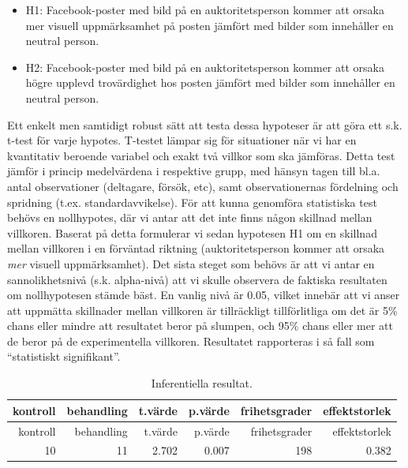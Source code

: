\documentclass[
]{book}
\begin{document}
\begin{itemize}
\item
  H1: Facebook-poster med bild på en auktoritetsperson kommer att orsaka mer visuell uppmärksamhet på posten jämfört med bilder som innehåller en neutral person.
\item
  H2: Facebook-poster med bild på en auktoritetsperson kommer att orsaka högre upplevd trovärdighet hos posten jämfört med bilder som innehåller en neutral person.
\end{itemize}

Ett enkelt men samtidigt robust sätt att testa dessa hypoteser är att göra ett s.k. t-test för varje hypotes. T-testet lämpar sig för situationer när vi har en kvantitativ beroende variabel och exakt två villkor som ska jämföras. Detta test jämför i princip medelvärdena i respektive grupp, med hänsyn tagen till bl.a. antal observationer (deltagare, försök, etc), samt observationernas fördelning och spridning (t.ex. standardavvikelse). För att kunna genomföra statistiska test behövs en nollhypotes, där vi antar att det inte finns någon skillnad mellan villkoren. Baserat på detta formulerar vi sedan hypotesen H1 om en skillnad mellan villkoren i en förväntad riktning (auktoritetsperson kommer att orsaka \emph{mer} visuell uppmärksamhet). Det sista steget som behövs är att vi antar en sannolikhetsnivå (s.k. alpha-nivå) att vi skulle observera de faktiska resultaten om nollhypotesen stämde bäst. En vanlig nivå är 0.05, vilket innebär att vi anser att uppmätta skillnader mellan villkoren är tillräckligt tillförlitliga om det är 5\% chans eller mindre att resultatet beror på slumpen, och 95\% chans eller mer att de beror på de experimentella villkoren. Resultatet rapporteras i så fall som ``statistiskt signifikant''.

\begin{longtable}[]{@{}rrrrrr@{}}
\caption{\label{tab:tab-02-08-1-2-01}Inferentiella resultat.}\tabularnewline
\toprule
kontroll & behandling & t.värde & p.värde & frihetsgrader & effektstorlek\tabularnewline
\midrule
\endfirsthead
\toprule
kontroll & behandling & t.värde & p.värde & frihetsgrader & effektstorlek\tabularnewline
\midrule
\endhead
10 & 11 & 2.702 & 0.007 & 198 & 0.382\tabularnewline
\bottomrule
\end{longtable}
\end{document}

